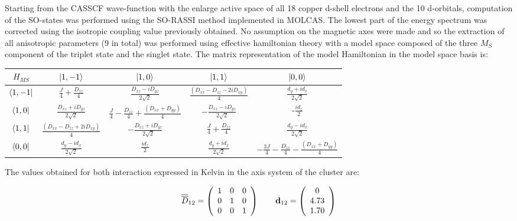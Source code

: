 \documentclass[10pt]{report}
\numberwithin{equation}{section}
\begin{document}
Starting from the CASSCF wave-function with the enlarge active space of all 18 copper d-shell electrons and the 10 d-orbitals, computation of the SO-states was performed using the SO-RASSI method implemented in MOLCAS.
The lowest part of the energy spectrum was corrected using the isotropic coupling value previously obtained.
No assumption on the magnetic axes were made and so the extraction of all anisotropic parameters (9 in total) was performed using effective hamiltonian theory with a model space composed of the three $M_S$ component of the triplet state and the singlet state.
The matrix representation of the model Hamiltonian in the model space basis is:
\begin{center}
    \begin{tabular}{c | c c c c}
        $H_{MS}$ & $\ket{1,-1}$ & $\ket{1,0}$ & $\ket{1,1}$ & $\ket{0,0}$\\
        \hline
        $\bra{1,-1}$ & $\frac{J}{4}+\frac{D_{zz}}{4}$ & $\frac{D_{xz}-iD_{yz}}{2\sqrt{2}}$ & $\frac{(D_{xx}-D_{zz}-2iD_{xy})}{4} $& $\frac{d_y+id_x}{2\sqrt{2}}$\\
        $\bra{1,0}$ & $\frac{D_{xz}+iD_{yz}}{2\sqrt{2}}$ &$ \frac{J}{4} -\frac{D_{zz}}{4} +\frac{(D_{xx}+D_{yy})}{4}$& $-\frac{D_{xz}-iD_{yz}}{2\sqrt{2}}$ & -$\frac{id_z}{2}$ \\
        $\bra{1,1}$ &$\frac{(D_{xx}-D_{zz}+2iD_{xy})}{4} $ & $-\frac{D_{xz}+iD_{yz}}{2\sqrt{2}}$ & $\frac{J}{4}+\frac{D_{zz}}{4}$ & $\frac{d_y-id_x}{2\sqrt{2}}$\\
        $\bra{0,0}$ & $\frac{d_y-id_x}{2\sqrt{2}}$  & $\frac{id_z}{2}$  &$\frac{d_y+id_x}{2\sqrt{2}}$  & $-\frac{3J}{4}-\frac{D_{zz}}{4}-\frac{(D_{xx}+D_{yy})}{4}$\\
    \end{tabular}
\end{center}

The values obtained for both interaction expressed in Kelvin in the axis system of the cluster are:

\[ \overline{\overline{D}}_{12}= \left( \begin{array}{c c c}
    1 & 0 & 0\\
    0 & 1 & 0\\
    0 & 0 & 1
    \end{array} \right)
    \qquad
    \vb{d}_{12}=
    \left( \begin{array}{c}
    0  \\
    4.73  \\
    1.70
    \end{array} \right)
    \]
    
\end{document}
